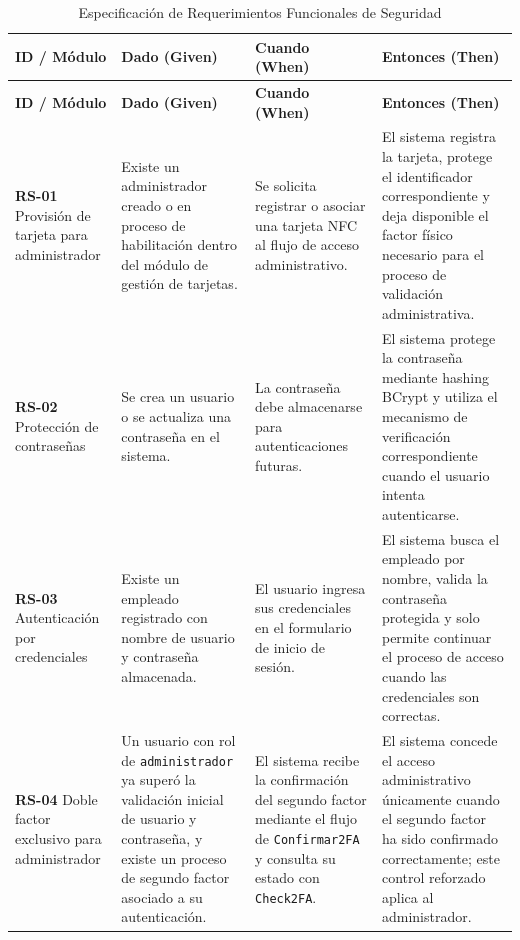 \begin{longtable}{|p{2.4cm}|p{4cm}|p{4cm}|p{4.5cm}|}
	\caption{Especificación de Requerimientos Funcionales de Seguridad}
	\label{tab:req_funcionales_seguridad} \\
	\hline
	\textbf{ID / Módulo} & \textbf{Dado (Given)} & \textbf{Cuando (When)} & \textbf{Entonces (Then)} \\
	\hline
	\endfirsthead
	
	\hline
	\textbf{ID / Módulo} & \textbf{Dado (Given)} & \textbf{Cuando (When)} & \textbf{Entonces (Then)} \\
	\hline
	\endhead
	
	\hline
	\endfoot
	
	\hline
	\endlastfoot
	
	\textbf{RS-01} \newline Provisión de tarjeta para administrador
	&
	Existe un administrador creado o en proceso de habilitación dentro del módulo de gestión de tarjetas.
	&
	Se solicita registrar o asociar una tarjeta NFC al flujo de acceso administrativo.
	&
	El sistema registra la tarjeta, protege el identificador correspondiente y deja disponible el factor físico necesario para el proceso de validación administrativa.
	\\
	\hline
	
	\textbf{RS-02} \newline Protección de contraseñas
	&
	Se crea un usuario o se actualiza una contraseña en el sistema.
	&
	La contraseña debe almacenarse para autenticaciones futuras.
	&
	El sistema protege la contraseña mediante hashing BCrypt y utiliza el mecanismo de verificación correspondiente cuando el usuario intenta autenticarse.
	\\
	\hline
	
	\textbf{RS-03} \newline Autenticación por credenciales
	&
	Existe un empleado registrado con nombre de usuario y contraseña almacenada.
	&
	El usuario ingresa sus credenciales en el formulario de inicio de sesión.
	&
	El sistema busca el empleado por nombre, valida la contraseña protegida y solo permite continuar el proceso de acceso cuando las credenciales son correctas.
	\\
	\hline
	
	\textbf{RS-04} \newline Doble factor exclusivo para administrador
	&
	Un usuario con rol de \texttt{administrador} ya superó la validación inicial de usuario y contraseña, y existe un proceso de segundo factor asociado a su autenticación.
	&
	El sistema recibe la confirmación del segundo factor mediante el flujo de \texttt{Confirmar2FA} y consulta su estado con \texttt{Check2FA}.
	&
	El sistema concede el acceso administrativo únicamente cuando el segundo factor ha sido confirmado correctamente; este control reforzado aplica al administrador.
	\\
	\hline
	

\end{longtable}
